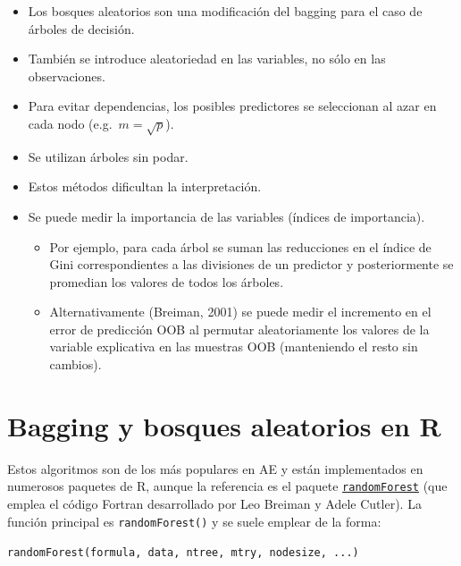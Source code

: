 \documentclass[
]{book}
\theoremstyle{break}
\theoremstyle{definition}
\theoremstyle{definition}
\theoremstyle{definition}
\theoremstyle{remark}
\begin{document}
\begin{itemize}
\item
  Los bosques aleatorios son una modificación del bagging para el caso de árboles de decisión.
\item
  También se introduce aleatoriedad en las variables, no sólo en las observaciones.
\item
  Para evitar dependencias, los posibles predictores se seleccionan al azar en cada nodo (e.g.~\(m=\sqrt{p}\)).
\item
  Se utilizan árboles sin podar.
\item
  Estos métodos dificultan la interpretación.
\item
  Se puede medir la importancia de las variables (índices de importancia).

  \begin{itemize}
  \item
    Por ejemplo, para cada árbol se suman las reducciones en el
    índice de Gini correspondientes a las divisiones de un
    predictor y posteriormente se promedian los valores de todos
    los árboles.
  \item
    Alternativamente (Breiman, 2001) se puede medir el incremento en el error de
    predicción OOB al permutar aleatoriamente los valores de la
    variable explicativa en las muestras OOB (manteniendo el resto
    sin cambios).
  \end{itemize}
\end{itemize}

\hypertarget{bagging-rf-r}{%
\section{Bagging y bosques aleatorios en R}\label{bagging-rf-r}}

Estos algoritmos son de los más populares en AE y están implementados en numerosos paquetes de R, aunque la referencia es el paquete \href{https://CRAN.R-project.org/package=randomForest}{\texttt{randomForest}} (que emplea el código Fortran desarrollado por Leo Breiman y Adele Cutler).
La función principal es \texttt{randomForest()} y se suele emplear de la forma:

\texttt{randomForest(formula,\ data,\ ntree,\ mtry,\ nodesize,\ ...)}
\end{document}
